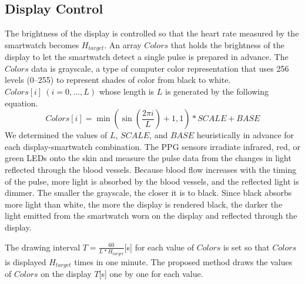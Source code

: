 \documentclass[sigconf]{acmart}
\begin{document}
\subsection{Display Control}
\label{subsec:display_control}
The brightness of the display is controlled so that the heart rate measured by the smartwatch becomes $H_{target}$. An array $Colors$ that holds the brightness of the display to let the smartwatch detect a single pulse is prepared in advance. The $Colors$ data is grayscale, a type of computer color representation that uses 256 levels (0--255) to represent shades of color from black to white. $Colors[i]~(i=0,\dots,L)$ whose length is $L$ is generated by the following equation.
\begin{equation}
  Colors[i]=\min\left(\sin\left(\frac{2\pi i}{L}\right)+1,1\right)*SCALE+BASE
\end{equation}
We determined the values of $L$, $SCALE$, and $BASE$ heuristically in advance for each display-smartwatch combination. The PPG sensors irradiate infrared, red, or green LEDs onto the skin and measure the pulse data from the changes in light reflected through the blood vessels. Because blood flow increases with the timing of the pulse, more light is absorbed by the blood vessels, and the reflected light is dimmer. The smaller the grayscale, the closer it is to black. Since black absorbs more light than white, the more the display is rendered black, the darker the light emitted from the smartwatch worn on the display and reflected through the display.\par

The drawing interval $T=\frac{60}{L * H_{target}}$[s] for each value of $Colors$ is set so that $Colors$ is displayed $H_{target}$ times in one minute.
The proposed method draws the values of $Colors$ on the display $T$[s] one by one for each value.
\end{document}
